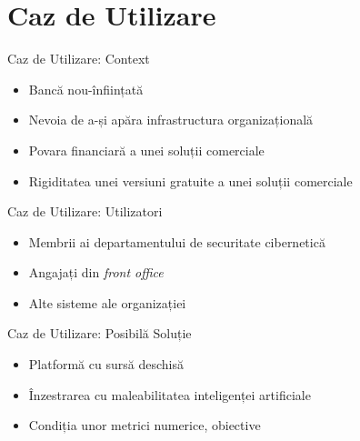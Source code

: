 \section{Caz de Utilizare}

\begin{frame}{Caz de Utilizare: Context} \pause
	\begin{itemize}
		\item Bancă nou-înființată \pause
        \item Nevoia de a-și apăra infrastructura organizațională \pause
        \item Povara financiară a unei soluții comerciale \pause
        \item Rigiditatea unei versiuni gratuite a unei soluții comerciale
	\end{itemize}
\end{frame}

\begin{frame}{Caz de Utilizare: Utilizatori} \pause
	\begin{itemize}
		\item Membrii ai departamentului de securitate cibernetică \pause
		\item Angajați din \textit{front office} \pause
		\item Alte sisteme ale organizației
	\end{itemize}
\end{frame}

\begin{frame}{Caz de Utilizare: Posibilă Soluție} \pause
	\begin{itemize}
		\item Platformă cu sursă deschisă \pause
		\item Înzestrarea cu maleabilitatea inteligenței artificiale \pause
		\item Condiția unor metrici numerice, obiective
	\end{itemize}
\end{frame}